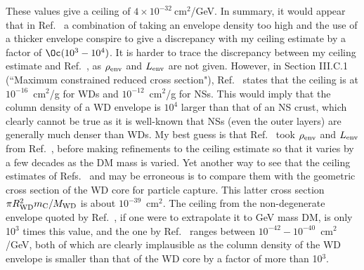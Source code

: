 \documentclass[
    twocolumn,
	prd,
        amssymb,
	preprintnumbers,
	secnumarabic,
	nofootinbib,
	superscriptaddress]{revtex4-1}
\begin{document}
These values give a ceiling of $4 \times 10^{-32}~$cm$^2$/GeV.
In summary, it would appear that in Ref.~\cite{Graham:2018efk} a combination of taking an envelope density too high and the use of a thicker envelope conspire to give a discrepancy with my ceiling estimate by a factor of $\Oc(10^3-10^4)$. 
It is harder to trace the discrepancy between my ceiling estimate and Ref.~\cite{MACROSidhu2020}, as $\rho_{\rm env}$ and $L_{\rm env}$ are not given.
However, in Section III.C.1 (``Maximum constrained reduced cross section"), Ref.~\cite{MACROSidhu2020} states that the ceiling is at $10^{-16}$~cm$^2$/g for WDs and $10^{-12}$~cm$^2$/g for NSs. 
This would imply that the column density of a WD envelope is $10^4$ larger than that of an NS crust, which clearly cannot be true as it is well-known that NSs (even the outer layers) are generally much denser than WDs.
My best guess is that Ref.~\cite{MACROSidhu2020} took $\rho_{\rm env}$ and $L_{\rm env}$ from Ref.~\cite{Graham:2018efk}, before making refinements to the ceiling estimate so that it varies by a few decades as the DM mass is varied.
Yet another way to see that the ceiling estimates of Refs.~\cite{Graham:2018efk} and \cite{MACROSidhu2020} may be erroneous is to compare them with the geometric cross section of the WD core for particle capture.
This latter cross section $\pi R^2_{\rm WD} m_{\rm C}/M_{\rm WD}$ is about $10^{-39}$~cm$^2$. 
The ceiling from the non-degenerate envelope quoted by Ref.~\cite{Graham:2018efk}, if one were to extrapolate it to GeV mass DM, is only 10$^3$ times this value, and the one by Ref.~\cite{MACROSidhu2020} ranges between $10^{-42}-10^{-40}$~cm$^2$/GeV, both of which are clearly implausible as the column density of the WD envelope is smaller than that of the WD core by a factor of more than 10$^3$.
\end{document}
